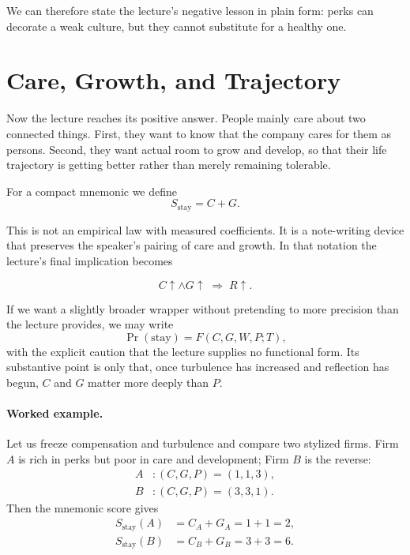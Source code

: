 We can therefore state the lecture's negative lesson in plain form: perks can decorate a weak culture, but they cannot substitute for a healthy one.

\section{Care, Growth, and Trajectory}

Now the lecture reaches its positive answer. People mainly care about two connected things. First, they want to know that the company cares for them as persons. Second, they want actual room to grow and develop, so that their life trajectory is getting better rather than merely remaining tolerable.

For a compact mnemonic we define
\begin{equation}
S_{\text{stay}} = C + G .
\end{equation}

This is not an empirical law with measured coefficients. It is a note-writing device that preserves the speaker's pairing of care and growth. In that notation the lecture's final implication becomes

\begin{equation}
C \uparrow \land G \uparrow \;\Rightarrow\; R \uparrow .
\end{equation}

If we want a slightly broader wrapper without pretending to more precision than the lecture provides, we may write
\begin{equation}
\Pr(\text{stay}) = F(C,G,W,P;T),
\end{equation}
with the explicit caution that the lecture supplies no functional form. Its substantive point is only that, once turbulence has increased and reflection has begun, \(C\) and \(G\) matter more deeply than \(P\).

\paragraph{Worked example.} Let us freeze compensation and turbulence and compare two stylized firms. Firm \(A\) is rich in perks but poor in care and development; Firm \(B\) is the reverse:
\begin{align}
A &: (C,G,P) = (1,1,3),\\
B &: (C,G,P) = (3,3,1).
\end{align}
Then the mnemonic score gives
\begin{align}
S_{\text{stay}}(A) &= C_A + G_A = 1+1 = 2,\\
S_{\text{stay}}(B) &= C_B + G_B = 3+3 = 6.
\end{align}

